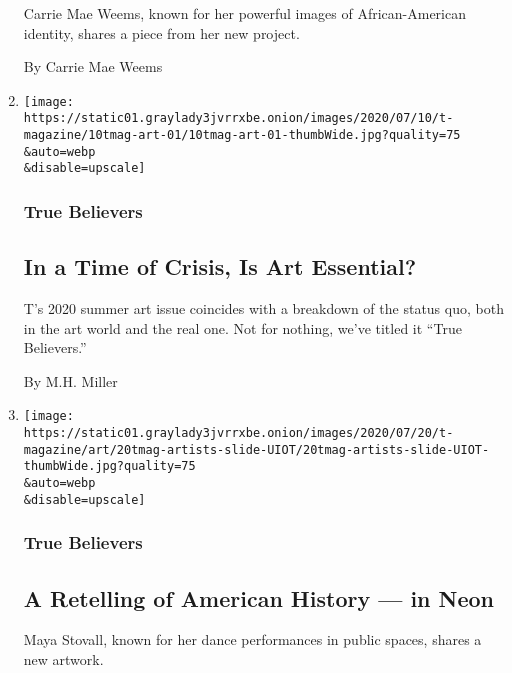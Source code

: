 \begin{enumerate}
  Carrie Mae Weems, known for her powerful images of African-American
  identity, shares a piece from her new project.

  By Carrie Mae Weems
\item
  \href{/2020/07/20/t-magazine/museums-galleries-open-art.html}{}

  \texttt{[image: https://static01.graylady3jvrrxbe.onion/images/2020/07/10/t-magazine/10tmag-art-01/10tmag-art-01-thumbWide.jpg?quality=75\\\&auto=webp\\\&disable=upscale]}

  \hypertarget{true-believers-10}{%
  \subsubsection{True Believers}\label{true-believers-10}}

  \hypertarget{in-a-time-of-crisis-is-art-essential-1}{%
  \subsection{In a Time of Crisis, Is Art
  Essential?}\label{in-a-time-of-crisis-is-art-essential-1}}

  T's 2020 summer art issue coincides with a breakdown of the status
  quo, both in the art world and the real one. Not for nothing, we've
  titled it ``True Believers.''

  By M.H. Miller
\item
  \href{/2020/07/20/t-magazine/maya-stovall.html}{}

  \texttt{[image: https://static01.graylady3jvrrxbe.onion/images/2020/07/20/t-magazine/art/20tmag-artists-slide-UIOT/20tmag-artists-slide-UIOT-thumbWide.jpg?quality=75\\\&auto=webp\\\&disable=upscale]}

  \hypertarget{true-believers-11}{%
  \subsubsection{True Believers}\label{true-believers-11}}

  \hypertarget{a-retelling-of-american-history--in-neon}{%
  \subsection{A Retelling of American History --- in
  Neon}\label{a-retelling-of-american-history--in-neon}}

  Maya Stovall, known for her dance performances in public spaces,
  shares a new artwork.


\end{enumerate}
